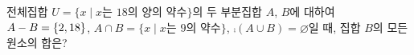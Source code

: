 전체집합 $U=\{x \mid x$는 $18$의 양의 약수$\}$의 두 부분집합 $A$, $B$에 대하여 $A-B=\{2{,}\mkern3mu\mathopen{}18\}$, $A\cap B=\{x \mid x$는 $9$의 약수$\}$, $\comp{(A\cup B)}=\varnothing$일 때, 집합 $B$의 모든 원소의 합은?
